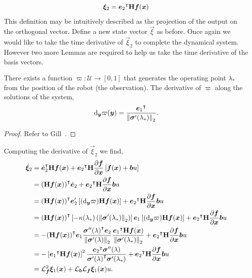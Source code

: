 $$\bm{\xi}_2 = {\bm{e}_2}^{\intercal}\mathbf{H}\bm{f}(\bm{x})$$
This definition may be intuitively described as the projection of the output on the orthogonal vector. Define a new state vector $\vec{\xi}$ as before. Once again we would like to take the time derivative of $\vec{\xi}_2$ to complete the dynamical system. However two more Lemmas are required to help us take the time derivative of the basis vectors.
\begin{lemma}
    There exists a function $\varpi:\mathcal{U}\to[0,1]$ that generates the operating point $\lambda_*$ from the position of the robot (the observation). The derivative of $\varpi$ along the solutions of the system,
    $$\mathop{}\!\mathrm{d}_{\bm{y}}\varpi(\bm{y}) = \frac{{\bm{e}_1}^{\intercal}}{\mathop{}\!\left\|\bm{\sigma}'(\lambda_*)\right\|_2}.$$
\end{lemma}
\begin{proof}
    Refer to Gill~\cite{Gill15}.
\end{proof}
Computing the derivative of $\vec{\xi}_2$ we find,
\begin{align*}
    \dot{\bm{\xi}}_2
                &=  {\dot{\bm{e}}_2}^{\intercal}\mathbf{H}\bm{f}(\bm{x})
                    +
                    {\bm{e}_2}^{\intercal}\mathbf{H}\frac{\partial\bm{f}}{\partial\bm{x}}\left[\bm{f}(\bm{x}) + \bm{b}u\right]\\
                &=  {(\mathbf{H}\bm{f}(\bm{x}))}^{\intercal}\dot{\bm{e}}_2
                    +
                    {\bm{e}_2}^{\intercal}\mathbf{H}\frac{\partial\bm{f}}{\partial\bm{x}} \bm{b} u \\
                &=  {(\mathbf{H}\bm{f}(\bm{x}))}^{\intercal}\bm{e}'_2\left[(\mathop{}\!\mathrm{d}_{\bm{y}}\varpi)\mathbf{H}\bm{f}(\bm{x}) \right]
                    +
                    {\bm{e}_2}^{\intercal}\mathbf{H}\frac{\partial\bm{f}}{\partial\bm{x}} \bm{b} u \\
                &=  {(\mathbf{H}\bm{f}(\bm{x}))}^{\intercal}\left[-\kappa(\lambda_*)\left(\mathop{}\!\left\|\bm{\sigma}'(\lambda_*)\right\|_2 \right)\right]\bm{e}_1\left[(\mathop{}\!\mathrm{d}_{\bm{y}}\varpi)\mathbf{H}\bm{f}(\bm{x})\right]
                    +
                    {\bm{e}_2}^{\intercal}\mathbf{H}\frac{\partial\bm{f}}{\partial\bm{x}}\bm{b} u\\
                &=  -{(\mathbf{H}\bm{f}(\bm{x}))}^{\intercal}\bm{e}_1 \frac{{\bm{\sigma}''(\lambda)}^{\intercal}\bm{e}_2}{\mathop{}\!\left\|\bm{\sigma}'(\lambda)\right\|_2}\frac{{\bm{e}_1}^{\intercal}\mathbf{H}\bm{f}(\bm{x})}{\mathop{}\!\left\|\bm{\sigma}'(\lambda_*)\right\|_2}
                    +
                    {\bm{e}_2}^{\intercal}\mathbf{H}\frac{\partial\bm{f}}{\partial\bm{x}}\bm{b} u\\
                &=  -\left[{\bm{e}_1}^{\intercal}\mathbf{H}\bm{f}(\bm{x})\right]^2 \frac{{\bm{e}_2}^{\intercal}\bm{\sigma}''(\lambda)}{{\bm{\sigma}'(\lambda)}^{\intercal}\bm{\sigma}'(\lambda_*)}
                    +
                    {\bm{e}_2}^{\intercal}\mathbf{H}\frac{\partial\bm{f}}{\partial\bm{x}}\bm{b} u\\
                &=  \mathcal{L}_{\bm{f}}^2\bm{\xi}_1(\bm{x}) + \mathcal{L}_{\bm{b}}\mathcal{L}_{\bm{f}}\bm{\xi}_1(\bm{x}) u.
\end{align*}
